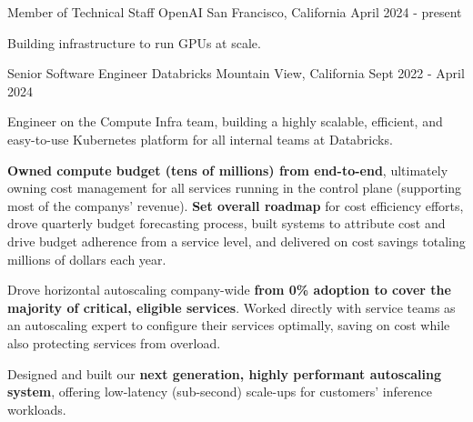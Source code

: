 

\begin{cventries}


\cventry
{Member of Technical Staff}
{\acvHeaderIconSep OpenAI}
{San Francisco, California}
{April 2024 - present}
{
	\begin{cvitems}
		\item
Building infrastructure to run GPUs at scale. 
\end{cvitems}
}

\cventry
{Senior Software Engineer}
{\acvHeaderIconSep Databricks}
{Mountain View, California}
{Sept 2022 - April 2024}
{
	\begin{cvitems}
	\item Engineer on the Compute Infra team, building a highly scalable, efficient, and easy-to-use Kubernetes platform for all internal teams at Databricks.
	\item \textbf{Owned compute budget (tens of millions) from end-to-end}, ultimately owning cost management for all services running in the control plane (supporting most of the companys' revenue). \textbf{Set overall roadmap} for cost efficiency efforts, drove quarterly budget forecasting process, built systems to attribute cost and drive budget adherence from a service level, and delivered on cost savings totaling millions of dollars each year. 
	\item Drove horizontal autoscaling company-wide \textbf{from 0\% adoption to cover the majority of critical, eligible services}. Worked directly with service teams as an autoscaling expert to configure their services optimally, saving on cost while also protecting services from overload. 
	\item Designed and built our \textbf{next generation, highly performant autoscaling system}, offering low-latency (sub-second) scale-ups for customers' inference workloads. 
	\end{cvitems}
}


\end{cventries}

